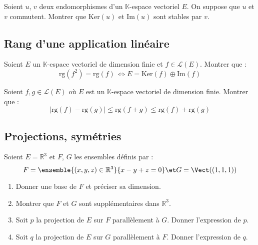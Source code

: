 \documentclass[a4paper,twoside,french,11pt]{VcCours}
\begin{document}
\begin{Exercice}{} Soient $u$, $v$ deux endomorphismes d'un $\mathbb{K}$-espace vectoriel $E$. On suppose que $u$ et $v$ commutent. Montrer que $\textrm{Ker}(u)$ et $\textrm{Im}(u)$ sont stables par $v$.
\end{Exercice} 

\medskip

\subsection{\large Rang d'une application linéaire}

\medskip


\begin{Exercice}{} Soient $E$ un $\mathbb{K}$-espace vectoriel de dimension finie et $f \in \mathcal{L}(E)$. Montrer que :
$$ \textrm{rg}(f^2 ) =  \textrm{rg}( f ) \, \Longleftrightarrow E = \textrm{Ker}(f) \oplus \textrm{Im}(f) $$
\end{Exercice}


\begin{Exercice}[$\bigstar$] Soient $f,g \in \mathcal{L}(E)$ où $E$ est un $\mathbb{K}$-espace vectoriel de dimension finie. Montrer que :
    \[
    \vert \textrm{rg}(f) - \textrm{rg}(g) \vert \leq \textrm{rg}(f + g) \leq \textrm{rg}(f) + \textrm{rg}(g)
    \]
\end{Exercice}

\medskip

\subsection{\large Projections, symétries}

\medskip


\begin{Exercice}{} Soient $E= \mathbb{R}^3$ et $F$, $G$ les ensembles définis par :
$$ F = \ensemble{(x,y,z) \in \mathbb{R}^3}{x-y+z=0} \et G = \Vect((1,1,1)) $$

\begin{enumerate}
\item Donner une base de $F$ et préciser sa dimension.
\item Montrer que $F$ et $G$ sont supplémentaires dans $\mathbb{R}^3$.
\item Soit $p$ la projection de $E$ sur $F$ parallèlement à $G$. Donner l'expression de $p$.
\item Soit $q$ la projection de $E$ sur $G$ parallèlement à $F$. Donner l'expression de $q$.
\end{enumerate}
\end{Exercice}
\end{document}
